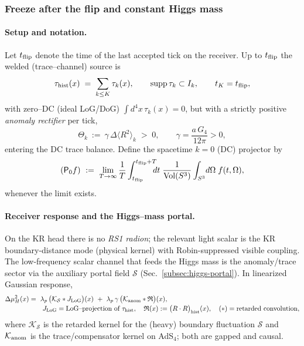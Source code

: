 \documentclass[10pt]{article}
\theoremstyle{definition}
\theoremstyle{plain}
\begin{document}
\subsubsection*{Freeze after the flip and constant Higgs mass}
\label{subsubsec:freeze-const-H}

\paragraph{Setup and notation.}\label{par:uom-main-127}
Let $t_{\rm flip}$ denote the time of the last accepted tick on the receiver. Up to $t_{\rm flip}$ the welded (trace–channel) source is
\[
\tau_{\rm hist}(x)\;=\;\sum_{k\le K}\tau_k(x),\qquad \mathrm{supp}\,\tau_k\subset I_k,\qquad t_K=t_{\rm flip},
\]
with zero–DC (ideal LoG/DoG) $\int d^4x\,\tau_k(x)=0$, but with a strictly positive \emph{anomaly rectifier} per tick,
\[
\Theta_k\ :=\ \gamma\,\Delta\!\langle R^2\rangle_k\;>\;0,\qquad 
\gamma=\frac{a\,G_4}{12\pi}>0,
\]
entering the DC trace balance. Define the spacetime $k{=}0$ (DC) projector by
\[
(\mathsf P_0 f)\ :=\ \lim_{T\to\infty}\frac{1}{T}\int_{t_{\rm flip}}^{t_{\rm flip}+T}\!\!\!\!dt\;\frac{1}{\mathrm{Vol}(S^3)}\int_{S^3}\!d\Omega\; f(t,\Omega),
\]
whenever the limit exists.

\paragraph{Receiver response and the Higgs--mass portal.}\label{par:uom-main-128}
On the KR head there is no \emph{RS1 radion}; the relevant light scalar is the KR boundary-distance mode
(physical kernel) with Robin-suppressed visible coupling. The low-frequency scalar channel that feeds the
Higgs mass is the anomaly/trace sector via the auxiliary portal field $\mathcal S$ (Sec.~\ref{subsec:higgs-portal}).
In linearized Gaussian response,
\begin{align}
\Delta \mu_H^2(x)
&=\ \lambda_p\,\big(\mathcal K_{\mathcal S} * J_{\rm LoG}\big)(x)\ +\ \lambda_p\,\gamma\,\big(\mathcal K_{\rm anom} * \mathfrak R\big)(x),
\label{eq:dmuh-master}
\\[-2pt]
&\qquad J_{\rm LoG}=\text{LoG–projection of }\tau_{\rm hist},\quad 
\mathfrak R(x):= \big(R\cdot R\big)_{\rm hist}(x),\quad
(*)=\text{retarded convolution},
\nonumber
\end{align}
where $\mathcal K_{\mathcal S}$ is the retarded kernel for the (heavy) boundary fluctuation $\mathcal S$ and $\mathcal K_{\rm anom}$ is the trace/compensator kernel on AdS$_4$; both are gapped and causal.
\end{document}
